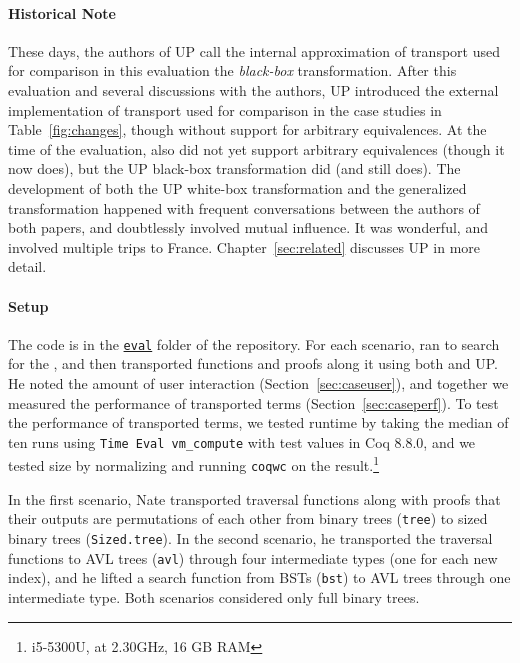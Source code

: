 
\paragraph{Historical Note}
These days, the authors of UP call the internal approximation of transport used for comparison in this evaluation the \textit{black-box} transformation.
After this evaluation and several discussions with the authors, UP introduced the external implementation of transport used for comparison in the case studies in Table~\ref{fig:changes},
though without support for arbitrary equivalences.
At the time of the evaluation, \toolnamec also did not yet support arbitrary equivalences (though it now does),
but the UP black-box transformation did (and still does).
The development of both the UP white-box transformation and the generalized \toolnamec transformation
happened with frequent conversations between the authors of both papers, and doubtlessly involved mutual influence.
It was wonderful, and involved multiple trips to France.
Chapter~\ref{sec:related} discusses UP in more detail.

\paragraph{Setup}
The code is in the \href{http://github.com/uwplse/ornamental-search/tree/itp+equiv/plugin/eval}{\lstinline{eval}} folder of the repository.
For each scenario,
 ran \toolnamec to search for the ,
and then transported functions and proofs along it using both \toolnamec and UP.
He noted the amount of user interaction (Section~\ref{sec:caseuser}),
and together we measured the performance of transported terms (Section~\ref{sec:caseperf}).
To test the performance of transported terms, we tested runtime by 
taking the median of ten runs using \lstinline{Time Eval vm_compute} with test values in Coq 8.8.0,
and we tested size by normalizing and running \lstinline{coqwc} on the result.\footnote{i5-5300U, at 2.30GHz, 16 GB RAM}

In the first scenario, Nate transported traversal functions along with proofs that their outputs are permutations of each other
from binary trees (\lstinline{tree}) to sized binary trees (\lstinline{Sized.tree}).
In the second scenario, he transported the traversal functions to AVL trees (\lstinline{avl}) through four intermediate
types (one for each new index),
and he lifted a search function from BSTs (\lstinline{bst}) to AVL trees through
one intermediate type. 
Both scenarios considered only full binary trees.

